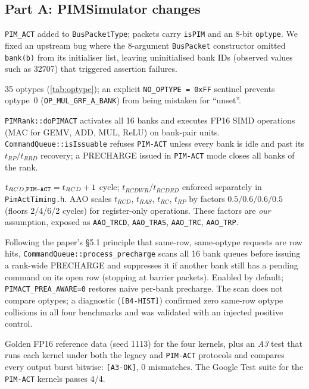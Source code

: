 \documentclass[conference]{IEEEtran}
\newcommand{\cmd}[1]{\texttt{\footnotesize #1}}
\newcommand{\pimact}{\cmd{PIM-ACT}\xspace}
\begin{document}
\subsection{Part A: PIMSimulator changes}\label{sec:partA}
\begin{description}[leftmargin=0pt,labelindent=0pt,font=\bfseries]
\item[Command set.] \cmd{PIM\_ACT} added to \cmd{BusPacketType}; packets carry \cmd{isPIM} and an 8-bit \cmd{optype}. We fixed an upstream bug where the 8-argument \cmd{BusPacket} constructor omitted \cmd{bank(b)} from its initialiser list, leaving uninitialised bank IDs (observed values such as 32707) that triggered assertion failures.
\item[Optype ISA.] 35 optypes (\cref{tab:optype}); an explicit \cmd{NO\_OPTYPE = 0xFF} sentinel prevents optype~0 (\cmd{OP\_MUL\_GRF\_A\_BANK}) from being mistaken for ``unset''.
\item[Multi-bank execution.] \cmd{PIMRank::doPIMACT} activates all 16 banks and executes FP16 SIMD operations (MAC for GEMV, ADD, MUL, ReLU) on bank-pair units. \cmd{CommandQueue::isIssuable} refuses \pimact unless every bank is idle and past its $t_{RP}/t_{RRD}$ recovery; a PRECHARGE issued in \pimact mode closes all banks of the rank.
\item[Timing.] $t_{RCD,\pimact}=t_{RCD}+1$ cycle; $t_{RCDWR}$/$t_{RCDRD}$ enforced separately in \cmd{PimActTiming.h}. AAO scales $t_{RCD}$, $t_{RAS}$, $t_{RC}$, $t_{RP}$ by factors $0.5/0.6/0.6/0.5$ (floors 2/4/6/2 cycles) for register-only operations. These factors are \emph{our} assumption, exposed as \cmd{AAO\_TRCD}, \cmd{AAO\_TRAS}, \cmd{AAO\_TRC}, \cmd{AAO\_TRP}.
\item[PREA-aware scheduling.] Following the paper's \S5.1 principle that same-row, same-optype requests are row hits, \cmd{CommandQueue::process\_precharge} scans all 16 bank queues before issuing a rank-wide PRECHARGE and suppresses it if another bank still has a pending command on its open row (stopping at barrier packets). Enabled by default; \cmd{PIMACT\_PREA\_AWARE=0} restores naive per-bank precharge. The scan does not compare optypes; a diagnostic (\cmd{[B4-HIST]}) confirmed zero same-row optype collisions in all four benchmarks and was validated with an injected positive control.
\item[Verification.] Golden FP16 reference data (seed 1113) for the four kernels, plus an \emph{A3} test that runs each kernel under both the legacy and \pimact protocols and compares every output burst bitwise: \cmd{[A3-OK]}, 0 mismatches. The Google Test suite for the \pimact kernels passes 4/4.
\end{description}
\end{document}
